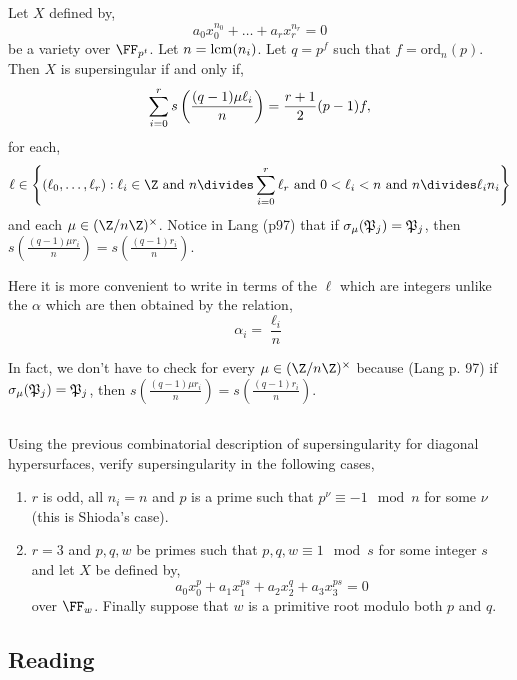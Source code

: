 \documentclass[12pt]{article}
\begin{document}
\begin{theorem}\label{thm:gauss_factor_SS}
Let $X$ defined by,
\[ a_0 x_0^{n_0} + \dots + a_r x_r^{n_r} = 0 \]
be a variety over $\FF_{p^t}$. Let $n = \mathrm{lcm}(n_i)$. Let $q = p^f$ such that $f = \text{ord}_n(p)$. Then $X$ is supersingular if and only if,
\[ \sum_{i = 0}^{r} s\left(  \frac{(q-1)\mu \ell_i}{n}  \right) = \frac{r+1}{2}(p - 1)f,\]
for each,
\[ \ell \in \left\{(\ell_0, \dots, \ell_r) : \ell_i \in \Z \text{ and } n \divides \sum_{i = 0}^{r} \ell_r \text{ and } 0 < \ell_i < n \text{ and } n \divides \ell_i n_i \right\} \]
and each $\mu \in (\Z/n\Z)^\times$. Notice in Lang (p97) that if $\sigma_\mu(\mathfrak{P}_j) = \mathfrak{P}_j$, then $s\left(\frac{(q-1)\mu r_i}{n}\right) = s\left(\frac{(q-1) r_i}{n}\right)$.
\end{theorem}

\begin{rmk}
Here it is more convenient to write in terms of the $\ell$ which are integers unlike the $\alpha$ which are then obtained by the relation,
\[ \alpha_i = \frac{\ell_i}{n} \] 
\end{rmk}

\begin{rmk}
In fact, we don't have to check for every $\mu \in (\Z / n \Z)^\times$ because (Lang p. 97) if $\sigma_\mu(\mathfrak{P}_j) = \mathfrak{P}_j$, then $s\left(\frac{(q-1)\mu r_i}{n}\right) = s\left(\frac{(q-1) r_i}{n}\right)$.
\end{rmk}


\subsection{}

Using the previous combinatorial description of supersingularity for diagonal hypersurfaces, verify supersingularity in the following cases,
\begin{enumerate}
\item $r$ is odd, all $n_i = n$ and $p$ is a prime such that $p^\nu \equiv -1 \mod n$ for some $\nu$ (this is Shioda's case).

\item $r = 3$ and $p,q,w$ be primes such that $p,q,w \equiv 1 \mod s$ for some integer $s$ and let $X$ be defined by,
\[ a_0 x_0^p + a_1 x_1^{ps} + a_2 x_2^q + a_3 x_3^{ps} = 0 \]
over $\FF_w$. Finally suppose that $w$ is a primitive root modulo both $p$ and $q$.
\end{enumerate}

\subsection{Reading}
\end{document}
